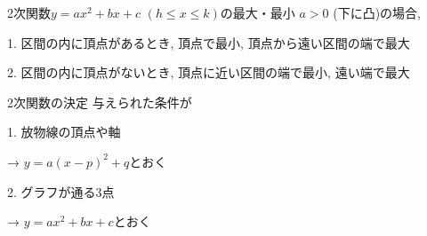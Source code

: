 \documentclass[aspectratio=169, 12pt]{beamer} %
\begin{document}
\begin{frame}{2次関数$y=ax^2+bx+c$ $(h\leq x \leq k)$の最大・最小}
    $a>0$ (下に凸)の場合, \par
    1. 区間の内に頂点があるとき,  頂点で最小, 頂点から遠い区間の端で最大 \par
    2. 区間の内に頂点がないとき,  頂点に近い区間の端で最小, 遠い端で最大
\end{frame}
\begin{frame}{2次関数の決定}
    与えられた条件が\par
    1. 放物線の頂点や軸 \par
    \begin{center}
        → $y=a(x-p)^2+q$とおく \par
    \end{center}
    2. グラフが通る3点 \par
    \begin{center}
        → $y=ax^2+bx+c$とおく
    \end{center}
\end{frame}
\end{document}
